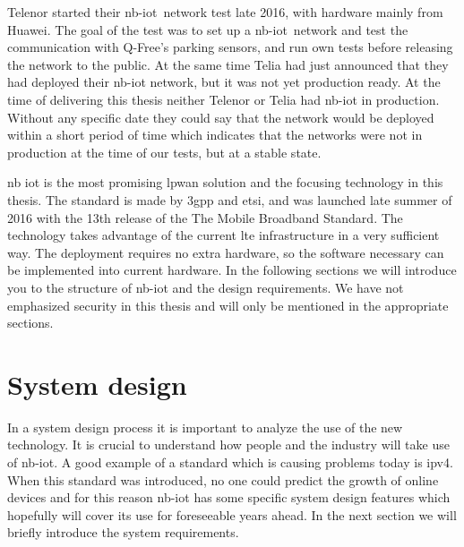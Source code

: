 \documentclass[USenglish]{ifimaster}  %
\begin{document}
Telenor started their \acrshort{nb-iot} network test late 2016, with hardware mainly from Huawei. The goal of the test was to set up a \acrshort{nb-iot} network and test the communication with Q-Free's parking sensors, and run own tests before releasing the network to the public. At the same time Telia had just announced that they had deployed their \acrshort{nb-iot} network, but it was not yet production ready. At the time of delivering this thesis neither Telenor or Telia had \acrshort{nb-iot} in production. Without any specific date they could say that the network would be deployed within a short period of time which indicates that the networks were not in production at the time of our tests, but at a stable state.

\acrfull{nb} \acrfull{iot} is the most promising \acrshort{lpwan} solution and the focusing technology in this thesis. The standard is made by \acrfull{3gpp} and \acrfull{etsi}, and was launched late summer of 2016 with the 13th release of the The Mobile Broadband Standard. The technology takes advantage of the current \acrshort{lte} infrastructure in a very sufficient way. The deployment requires no extra hardware, so the software necessary can be implemented into current hardware. In the following sections we will introduce you to the structure of \acrshort{nb-iot} and the design requirements. We have not emphasized security in this thesis and will only be mentioned in the appropriate sections.

\section{System design}
In a system design process it is important to analyze the use of the new technology. It is crucial to understand how people and the industry will take use of \acrshort{nb-iot}. A good example of a standard which is causing problems today is \acrshort{ipv4}. When this standard was introduced, no one could predict the growth of online devices and for this reason \acrshort{nb-iot} has some specific system design features which hopefully will cover its use for foreseeable years ahead. In the next section we will briefly introduce the system requirements.
\end{document}
